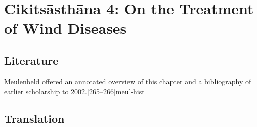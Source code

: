 
\chapter{Cikitsāsthāna 4:  On the Treatment of Wind 
    Diseases}

\section{Literature} 

Meulenbeld offered an annotated overview of this chapter and a bibliography
of earlier scholarship to 2002.[265--266]{meul-hist} 

\section{Translation}

